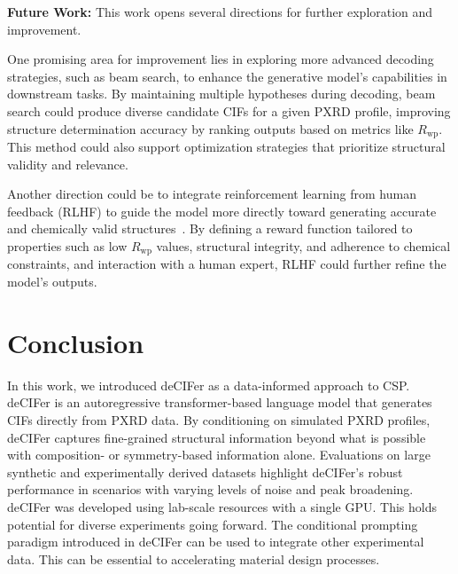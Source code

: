 {\bf Future Work:} This work opens several directions for further exploration and improvement. 

One promising area for improvement lies in exploring more advanced decoding strategies, such as beam search, to enhance the generative model's capabilities in downstream tasks. By maintaining multiple hypotheses during decoding, beam search could produce diverse candidate CIFs for a given PXRD profile, improving structure determination accuracy by ranking outputs based on metrics like $R_{\mathrm{wp}}$. This method could also support optimization strategies that prioritize structural validity and relevance.

Another direction could be to integrate reinforcement learning from human feedback (RLHF) to guide the model more directly toward generating accurate and chemically valid structures~\cite{ziegler2019fine}. By defining a reward function tailored to properties such as low $R_{\mathrm{wp}}$ values, structural integrity, and adherence to chemical constraints, and interaction with a human expert, RLHF could further refine the model's outputs. 

\section{Conclusion}

In this work, we introduced deCIFer as a data-informed approach to CSP. deCIFer is an autoregressive transformer-based language model that generates CIFs directly from PXRD data. By conditioning on simulated PXRD profiles, deCIFer captures fine-grained structural information beyond what is possible with composition- or symmetry-based information alone. Evaluations on large synthetic and experimentally derived datasets highlight deCIFer's robust performance in scenarios with varying levels of noise and peak broadening. deCIFer was developed using lab-scale resources with a single GPU. This holds potential for diverse experiments going forward. The conditional prompting paradigm introduced in deCIFer can be used to integrate other experimental data. This can be essential to accelerating material design processes. 